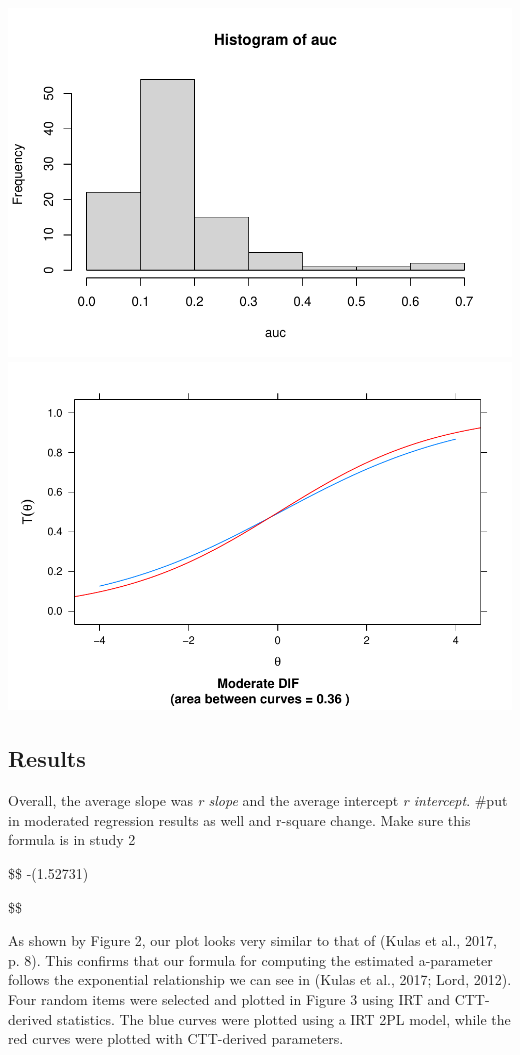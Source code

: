 \documentclass[
  man]{apa6}
\begin{document}
\includegraphics{ICC_project_files/figure-latex/sendtoETS-1.pdf} \includegraphics{ICC_project_files/figure-latex/sendtoETS-2.pdf}

\hypertarget{results}{%
\subsection{Results}\label{results}}

Overall, the average slope was \emph{r slope} and the average intercept \emph{r intercept}.
\#put in moderated regression results as well and r-square change. Make sure this formula is in study 2

\$\$
-(1.52731)

\$\$

As shown by Figure 2, our plot looks very similar to that of (Kulas et al., 2017, p. 8). This confirms that our formula for computing the estimated a-parameter follows the exponential relationship we can see in (Kulas et al., 2017; Lord, 2012). Four random items were selected and plotted in Figure 3 using IRT and CTT-derived statistics. The blue curves were plotted using a IRT 2PL model, while the red curves were plotted with CTT-derived parameters.
\end{document}
